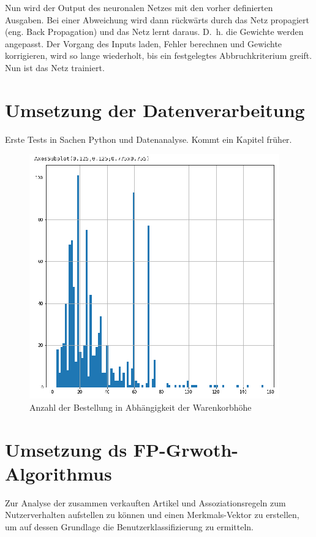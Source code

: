 Nun wird der Output des neuronalen Netzes mit den vorher definierten Ausgaben. Bei einer Abweichung wird dann rückwärts durch das Netz propagiert (eng. Back Propagation) und das Netz lernt daraus. D. h. die Gewichte werden angepasst. Der Vorgang des Inputs laden, Fehler berechnen und Gewichte korrigieren, wird so lange wiederholt, bis ein festgelegtes Abbruchkriterium greift. Nun ist das Netz trainiert.

\section{Umsetzung der Datenverarbeitung}
Erste Tests in Sachen Python und Datenanalyse. Kommt ein Kapitel früher.

\begin{figure}[!ht]
	\centering
	\includegraphics[width=\linewidth]{images/chapter4/first_plot.eps}
	\caption{Anzahl der Bestellung in Abhängigkeit der Warenkorbhöhe}
	\label{img:plot_count_amount}
\end{figure}

\section{Umsetzung ds FP-Grwoth-Algorithmus}
Zur Analyse der zusammen verkauften Artikel und Assoziationsregeln zum Nutzerverhalten aufstellen zu können und einen Merkmals-Vektor zu erstellen, um auf dessen Grundlage die Benutzerklassifizierung zu ermitteln.\vspace{0.2cm}

